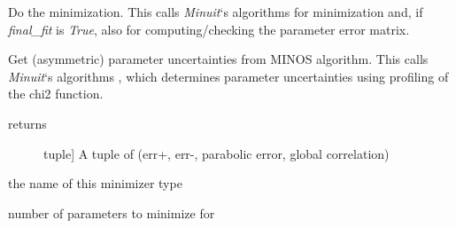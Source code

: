 \documentclass[a4paper,10pt,english]{sphinxmanual}
\begin{document}
\begin{fulllineitems}
\begin{fulllineitems}
\end{fulllineitems}


\begin{fulllineitems}
\label{index:kafe.iminuit_wrapper.IMinuit.minimize}
Do the minimization. This calls \emph{Minuit}`s algorithms 
for minimization and, if \emph{final\_fit} is \emph{True}, also 
for computing/checking the parameter error matrix.

\end{fulllineitems}


\begin{fulllineitems}
\label{index:kafe.iminuit_wrapper.IMinuit.minos_errors}
Get (asymmetric) parameter uncertainties from MINOS
algorithm. This calls \emph{Minuit}`s algorithms ,
which determines parameter uncertainties using profiling
of the chi2 function.
\begin{description}
\item[{returns}] \leavevmode{[}tuple{]}
A tuple of (err+, err-, parabolic error, global correlation)

\end{description}

\end{fulllineitems}


\begin{fulllineitems}
\label{index:kafe.iminuit_wrapper.IMinuit.name}
the name of this minimizer type

\end{fulllineitems}


\begin{fulllineitems}
\label{index:kafe.iminuit_wrapper.IMinuit.number_of_parameters}
number of parameters to minimize for

\end{fulllineitems}


\end{fulllineitems}
\end{document}
